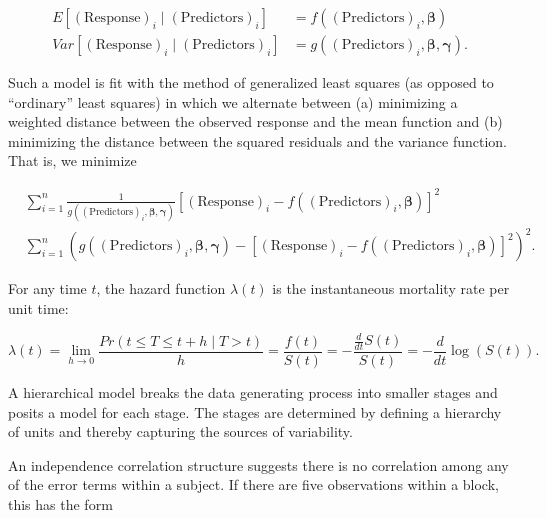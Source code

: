 \documentclass[
  letterpaper,
  DIV=11,
  numbers=noendperiod]{scrreprt}
\providecommand{\tightlist}{%
  \setlength{\itemsep}{0pt}\setlength{\parskip}{0pt}}\usepackage{longtable,booktabs,array}
\theoremstyle{definition}
\theoremstyle{definition}
\theoremstyle{remark}
\begin{document}
\[
\begin{aligned}
  E\left[(\text{Response})_i \mid (\text{Predictors})_i\right]
    &= f\left((\text{Predictors})_i, \boldsymbol{\beta}\right) \\
  Var\left[(\text{Response})_i \mid (\text{Predictors})_i\right]
    &= g\left((\text{Predictors})_i, \boldsymbol{\beta}, \boldsymbol{\gamma}\right).
\end{aligned}
\]

Such a model is fit with the method of generalized least squares (as
opposed to ``ordinary'' least squares) in which we alternate between (a)
minimizing a weighted distance between the observed response and the
mean function and (b) minimizing the distance between the squared
residuals and the variance function. That is, we minimize

\[
\begin{aligned}
  &\sum_{i=1}^{n} \frac{1}{g\left((\text{Predictors})_i, \boldsymbol{\beta}, \boldsymbol{\gamma}\right)} \left[(\text{Response})_i - f\left((\text{Predictors})_i, \boldsymbol{\beta}\right)\right]^2 \\
  &\sum_{i=1}^{n} \left(g\left((\text{Predictors})_i, \boldsymbol{\beta}, \boldsymbol{\gamma}\right) - \left[(\text{Response})_i - f\left((\text{Predictors})_i, \boldsymbol{\beta}\right)\right]^2\right)^2.
\end{aligned}
\]

\begin{description}
\tightlist
\item[Hazard Function (Definition~\ref{def-hazard})]
For any time \(t\), the hazard function \(\lambda(t)\) is the
instantaneous mortality rate per unit time:
\end{description}

\[\lambda(t) = \lim_{h \rightarrow 0} \frac{Pr(t \leq T \leq t + h \mid T > t)}{h} = \frac{f(t)}{S(t)} = -  \frac{\frac{d}{dt} S(t)}{S(t)} = -\frac{d}{dt} \log(S(t)).\]

\begin{description}
\tightlist
\item[Hierarchical Model (Definition~\ref{def-hierarchical-model})]
A hierarchical model breaks the data generating process into smaller
stages and posits a model for each stage. The stages are determined by
defining a hierarchy of units and thereby capturing the sources of
variability.
\item[Independence Correlation Structure
(Definition~\ref{def-independence-correlation-structure})]
An independence correlation structure suggests there is no correlation
among any of the error terms within a subject. If there are five
observations within a block, this has the form
\end{description}
\end{document}
